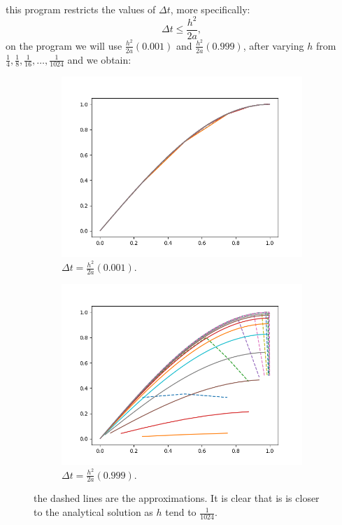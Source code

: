 \documentclass{article}
\begin{document}
\paragraph{} this program restricts the values of $\Delta t$, more specifically:
$$\Delta t \leq \frac{h^2}{2a},$$
on the program we will use $\frac{h^2}{2a} (0.001)$ and $\frac{h^2}{2a}(0.999)$, after varying $h$ from $\frac{1}{4}, \frac{1}{8}, \frac{1}{16}, \dots,  \frac{1}{1024}$ and we obtain:
\begin{figure}[h!]
	\centering
	\begin{subfigure}[b]{0.4\linewidth}
		\includegraphics[width=\linewidth]{1.png}
		\caption{$\Delta t = \frac{h^2}{2a}(0.001)$.}
	\end{subfigure}
	\begin{subfigure}[b]{0.4\linewidth}
		\includegraphics[width=\linewidth]{2.png}
		\caption{$\Delta t = \frac{h^2}{2a} (0.999)$.}
	\end{subfigure}
	\caption{the dashed lines are the approximations. It is clear that is is closer to the analytical solution as $h$ tend to $\frac{1}{1024}$.}
	\label{fig:cmp1}
\end{figure}
\end{document}
